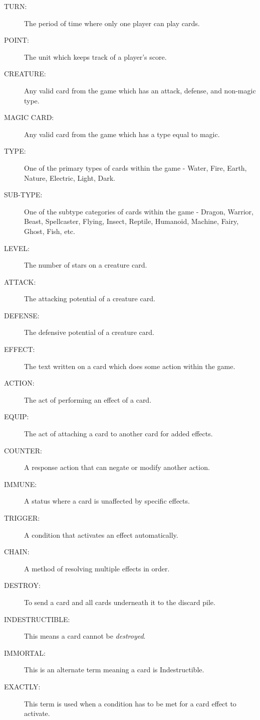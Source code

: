 \begin{description}
    \item[TURN:] The period of time where only one player can play cards.
    \item[POINT:] The unit which keeps track of a player's score.
    \item[CREATURE:] Any valid card from the game which has an attack, defense, and non-magic type.
    \item[MAGIC CARD:] Any valid card from the game which has a type equal to magic.
    \item[TYPE:] One of the primary types of cards within the game - Water, Fire, Earth, Nature, Electric, Light, Dark.
    \item[SUB-TYPE:] One of the subtype categories of cards within the game - Dragon, Warrior, Beast, Spellcaster, Flying, Insect, Reptile, Humanoid, Machine, Fairy, Ghost, Fish, etc.
    \item[LEVEL:] The number of stars on a creature card.
    \item[ATTACK:] The attacking potential of a creature card.
    \item[DEFENSE:] The defensive potential of a creature card.
    \item[EFFECT:] The text written on a card which does some action within the game.
    \item[ACTION:] The act of performing an effect of a card.
    \item[EQUIP:] The act of attaching a card to another card for added effects.
    \item[COUNTER:] A response action that can negate or modify another action.
    \item[IMMUNE:] A status where a card is unaffected by specific effects.
    \item[TRIGGER:] A condition that activates an effect automatically.
    \item[CHAIN:] A method of resolving multiple effects in order.
    \item[DESTROY:] To send a card and all cards underneath it to the discard pile.
    \item[INDESTRUCTIBLE:]  This means a card cannot be \textit{destroyed}.
    \item[IMMORTAL:] This is an alternate term meaning a card is Indestructible.
    \item[EXACTLY:] This term is used when a condition has to be met for a card effect to activate.
\end{description}











